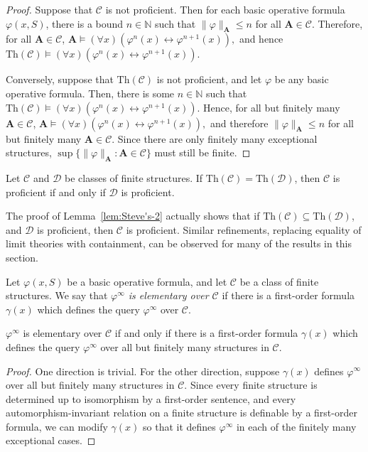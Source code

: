 \documentclass{lmcs}
\newcommand{\Th}{\mathrm{Th}}
\newcommand{\A}{\mathbf{A}}
\theoremstyle{thmC}
\begin{document}
\begin{proof}
Suppose that $\mathcal{C}$ is not proficient. Then for each basic operative formula $\varphi(x,S)$, there is a bound $n\in \mathbb{N}$ such that $\|\varphi\|_\A \leq n$ for all $\A\in \mathcal{C}$. Therefore, for all $\A \in \mathcal{C}$, $ \A \models (\forall x)(\varphi^n(x)\leftrightarrow \varphi^{n+1}(x)),$ and hence $\mathrm{Th}(\mathcal{C}) \models (\forall x)(\varphi^n(x)\leftrightarrow \varphi^{n+1}(x)).$


Conversely, suppose that $\mathrm{Th}(\mathcal{C})$ is not proficient, and let $\varphi$ be any basic operative formula. Then, there is some $n \in \mathbb{N}$ such that $ \mathrm{Th}(\mathcal{C}) \models (\forall x)(\varphi^n(x)\leftrightarrow \varphi^{n+1}(x)).$ Hence, for all but finitely many $\A \in \mathcal{C}$, $\A \models (\forall x)(\varphi^n(x)\leftrightarrow \varphi^{n+1}(x)),$ and therefore $\| \varphi \|_\A \le n$ for all but finitely many $\A \in \mathcal{C}$. Since there are only finitely many exceptional structures, $\sup \{ \|\varphi \|_\A : \A \in \mathcal{C} \}$ must still be finite.
\end{proof}

\begin{cor}
Let $\mathcal{C}$ and $\mathcal{D}$ be classes of finite structures. 
If $\Th(\mathcal{C}) = \Th(\mathcal{D})$, then $\mathcal{C}$ is proficient if and only if $\mathcal{D}$ is proficient.
\end{cor}

The proof of Lemma~\ref{lem:Steve's-2} actually shows that if $\Th(\mathcal{C})\subseteq \Th(\mathcal{D})$, and $\mathcal{D}$ is proficient, then $\mathcal{C}$ is proficient. Similar refinements, replacing equality of limit theories with containment, can be observed for many of the results in this section.

\begin{defi}
Let $\varphi(x,S)$ be a basic operative formula, and let $\mathcal{C}$ be a class of finite structures. We say that \emph{$\varphi^\infty$ is elementary over $\mathcal{C}$} if there is a first-order formula $\gamma(x)$ which defines the query $\varphi^\infty$ over $\mathcal{C}$. 
\end{defi}

\begin{lem}\label{lem:fixingfinite}
$\varphi^\infty$ is elementary over $\mathcal{C}$ if and only if there is a first-order formula $\gamma(x)$ which defines the query $\varphi^\infty$ over all but finitely many structures in $\mathcal{C}$. 
\end{lem}
\begin{proof}
One direction is trivial. For the other direction, suppose $\gamma(x)$ defines $\varphi^\infty$ over all but finitely many structures in $\mathcal{C}$. Since every finite structure is determined up to isomorphism by a first-order sentence, and every automorphism-invariant relation on a finite structure is definable by a first-order formula, we can modify $\gamma(x)$ so that it defines $\varphi^\infty$ in each of the finitely many exceptional cases. 
\end{proof}
\end{document}
